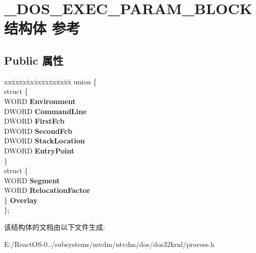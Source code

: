 \hypertarget{struct___d_o_s___e_x_e_c___p_a_r_a_m___b_l_o_c_k}{}\section{\+\_\+\+D\+O\+S\+\_\+\+E\+X\+E\+C\+\_\+\+P\+A\+R\+A\+M\+\_\+\+B\+L\+O\+C\+K结构体 参考}
\label{struct___d_o_s___e_x_e_c___p_a_r_a_m___b_l_o_c_k}
\subsection*{Public 属性}
\begin{DoxyCompactItemize}
\item 
\mbox{\label{struct___d_o_s___e_x_e_c___p_a_r_a_m___b_l_o_c_k_abe8212e30802038f3dbdf41aa25fae20}} 
\begin{tabbing}
xx\=xx\=xx\=xx\=xx\=xx\=xx\=xx\=xx\=\kill
union \{\\
\mbox{\label{union___d_o_s___e_x_e_c___p_a_r_a_m___b_l_o_c_k_1_1_0D3710_a6134c01c1e0fb173720fa356f3728c4d}} 
\>struct \{\\
\>\>WORD {\bfseries Environment}\\
\>\>DWORD {\bfseries CommandLine}\\
\>\>DWORD {\bfseries FirstFcb}\\
\>\>DWORD {\bfseries SecondFcb}\\
\>\>DWORD {\bfseries StackLocation}\\
\>\>DWORD {\bfseries EntryPoint}\\
\>\} \\
\>struct \{\\
\>\>WORD {\bfseries Segment}\\
\>\>WORD {\bfseries RelocationFactor}\\
\>\} {\bfseries Overlay}\\
\}; \\

\end{tabbing}\end{DoxyCompactItemize}


该结构体的文档由以下文件生成\+:\begin{DoxyCompactItemize}
\item 
E\+:/\+React\+O\+S-\/0../subsystems/mvdm/ntvdm/dos/dos32krnl/process.\+h\end{DoxyCompactItemize}
